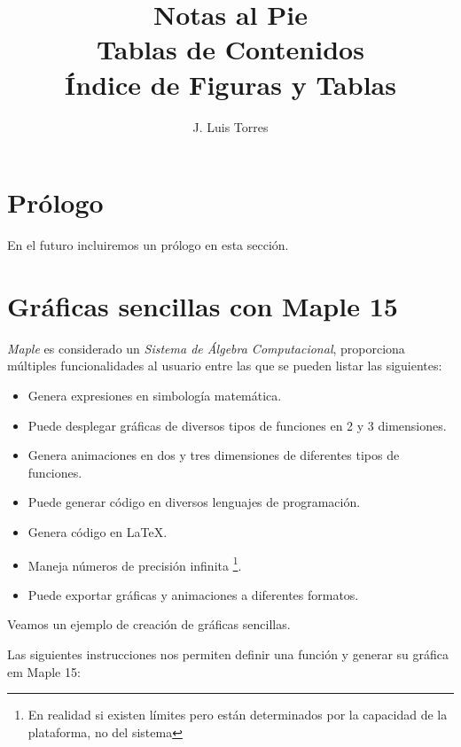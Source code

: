 \documentclass[letterpaper,12pt]{book}
\title{Notas al Pie \\ 
	\vspace{1cm}Tablas de Contenidos \\ 
	\vspace{1cm}Índice de Figuras y Tablas}
\author{J. Luis Torres}
\begin{document}
\maketitle
\frontmatter %

\tableofcontents

\listoffigures
{}

\listoftables



\chapter{Prólogo}

En el futuro incluiremos un prólogo en esta sección.

\mainmatter %

\chapter{Gráficas sencillas con Maple 15}


\emph{Maple} es considerado un \emph{Sistema de Álgebra Computacional}, proporciona múltiples
funcionalidades al usuario entre las que se pueden listar las siguientes:

\begin{itemize}
	\item Genera expresiones en simbología matemática.
	\item Puede desplegar gráficas de diversos tipos de funciones en 2 y 3 dimensiones.
	\item Genera animaciones en dos y tres dimensiones de diferentes tipos de funciones.
	\item Puede generar código en diversos lenguajes de programación.
	\item Genera código en \LaTeX{}.
	\item Maneja números de precisión infinita \footnote{En realidad si existen límites pero están 
		determinados por la capacidad de la plataforma, no del sistema}.
	\item Puede exportar gráficas y animaciones a diferentes formatos.
\end{itemize}

Veamos un ejemplo de creación de gráficas sencillas.

Las siguientes instrucciones nos permiten definir una función y generar su gráfica 
em Maple 15:
\end{document}
